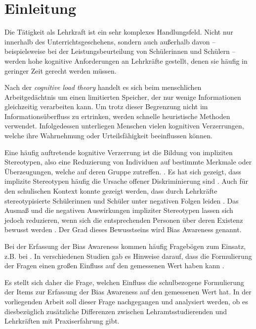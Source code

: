 \chapter{Einleitung}
\label{ch:einleitung}

Die Tätigkeit als Lehrkraft ist ein sehr komplexes Handlungsfeld.
Nicht nur innerhalb des Unterrichtsgeschehens, sondern auch außerhalb davon -- beispielsweise bei der Leistungsbeurteilung von Schülerinnen und Schülern -- werden hohe kognitive Anforderungen an Lehrkräfte gestellt, denen sie häufig in geringer Zeit gerecht werden müssen.

Nach der \emph{cognitive load theory} \citep{atkinson1968human} handelt es sich beim menschlichen Arbeitgedächtnis um einen limitierten Speicher, der nur wenige Informationen gleichzeitig verarbeiten kann.
Um trotz dieser Begrenzung nicht im Informationsüberfluss zu ertrinken, werden schnelle heuristische Methoden verwendet.
Infolgedessen unterliegen Menschen vielen kognitiven Verzerrungen, welche ihre Wahrnehmung oder Urteilsfähigkeit beeinflussen können.

Eine häufig auftretende kognitive Verzerrung ist die Bildung von impliziten Stereotypen, also eine Reduzierung von Individuen auf bestimmte Merkmale oder Überzeugungen, welche auf deren Gruppe zutreffen. \citep{greenwald1995implicit}.
Es hat sich gezeigt, dass implizite Stereotypen häufig die Ursache offener Diskriminierung sind \citep{agerstrom2011role, picho2013exploring}.
Auch für den schulischen Kontext konnte gezeigt werden, dass durch Lehrkräfte stereotypisierte Schülerinnen und Schüler unter negativen Folgen leiden \citep{martiny2020theoretischer}.
Das Ausmaß und die negativen Auswirkungen impliziter Stereotypen lassen sich jedoch reduzieren, wenn sich die entsprechenden Personen über deren Existenz bewusst werden \citep{monteith1993self, perry2015modern}.
Der Grad dieses Bewusstseins wird Bias Awareness genannt.

Bei der Erfassung der Bias Awareness kommen häufig Fragebögen zum Einsatz, z.B. bei \citet{perry2015modern}.
In verschiedenen Studien gab es Hinweise darauf, dass die Formulierung der Fragen einen großen Einfluss auf den gemessenen Wert haben kann \citep{kaminski2017situational, bing2004incremental, guyatt1999effect}.

Es stellt sich daher die Frage, welchen Einfluss die schulbezogene Formulierung der Items zur Erfassung der Bias Awareness auf den gemessenen Wert hat.
In der vorliegenden Arbeit soll dieser Frage nachgegangen und analysiert werden, ob es diesbezüglich zusätzliche Differenzen zwischen Lehramtsstudierenden und Lehrkräften mit Praxiserfahrung gibt.